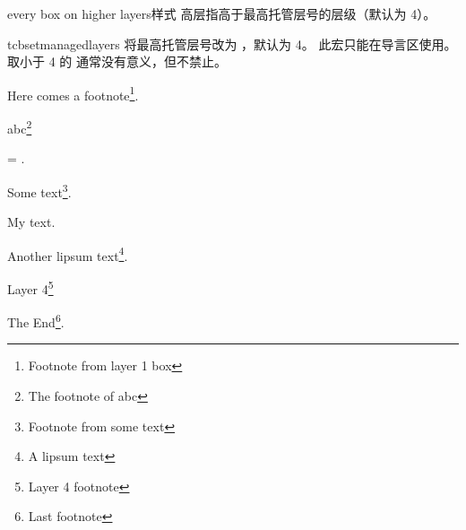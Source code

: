 \begin{docTcbKey}{every box on higher layers}{}{样式}
高层指高于最高托管层号的层级（默认为 4）。
\begin{dispListing}
\end{dispListing}
\end{docTcbKey}


\begin{docCommand}{tcbsetmanagedlayers}{}
  将最高托管层号改为 ，默认为 4。
  此宏只能在导言区使用。取小于 4 的  通常没有意义，但不禁止。
\end{docCommand}

\begin{tcboutputlisting}
\begin{tcolorbox}[enhanced jigsaw,breakable,title=Layer 1 Box]
Here comes a footnote\footnote{Footnote from layer 1 box}.
\lipsum[2]
  \begin{tcolorbox}[title=Layer 2 Box]
  abc\footnote{The footnote of abc}
  \end{tcolorbox}
  \begin{tcolorbox}[title=Another Box,ams equation]
     = \infty.
  \end{tcolorbox}
Some text\footnote{Footnote from some text}.
  \begin{tcolorbox}[title=Yet Another Box]
    \tcboxfit[height=2cm]{\lipsum[1]}
    My text.
    \begin{tcolorbox}
      Another lipsum text\footnote{A lipsum text}. \lipsum[3]
      \begin{tcolorbox}[title=Layer 4,colframe=blue,colback=white]
        Layer 4\footnote{Layer 4 footnote}
      \end{tcolorbox}
      The End\footnote{Last footnote}.
    \end{tcolorbox}
  \end{tcolorbox}
\end{tcolorbox}
\end{tcboutputlisting}

